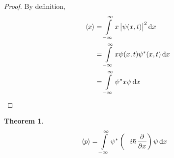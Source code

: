 \documentclass[titlepage, fleqn, a4paper, 12pt, twoside]{article}
\theoremstyle{definition}
\theoremstyle{theorem}
\newtheorem{theorem}{Theorem}
\begin{document}
\begin{proof}
	By definition,
	\begin{align*}
		\langle x \rangle & = \int\limits_{-\infty}^{\infty} x \left| \psi(x,t) \right|^2 \dif x \\
                                  & = \int\limits_{-\infty}^{\infty} x \psi(x,t) \psi^*(x,t) \dif x      \\
                                  & = \int\limits_{-\infty}^{\infty} \psi^* x \psi \dif x
	\end{align*}
\end{proof}

\begin{theorem}
	\begin{align*}
		\langle p \rangle & = \int\limits_{-\infty}^{\infty} \psi^* \left( -i \hbar \dpd{}{x} \right) \psi \dif x
	\end{align*}
\end{theorem}
\end{document}
